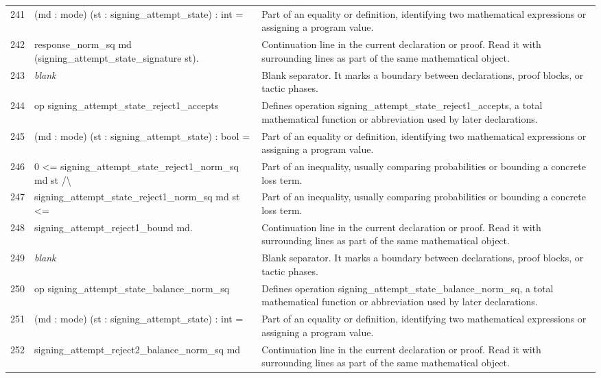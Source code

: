 \documentclass[10pt]{article}
\begin{document}
\begin{longtable}{r L{0.53\textwidth} L{0.37\textwidth}}
241 & {\ttfamily\scriptsize    (md : mode) (st : signing\_attempt\_state) : int =} & Part of an equality or definition, identifying two mathematical expressions or assigning a program value. \\
242 & {\ttfamily\scriptsize   response\_norm\_sq md (signing\_attempt\_state\_signature st).} & Continuation line in the current declaration or proof.  Read it with surrounding lines as part of the same mathematical object. \\
243 & {\ttfamily\scriptsize \emph{blank}} & Blank separator.  It marks a boundary between declarations, proof blocks, or tactic phases. \\
244 & {\ttfamily\scriptsize op signing\_attempt\_state\_reject1\_accepts} & Defines operation signing\_attempt\_state\_reject1\_accepts, a total mathematical function or abbreviation used by later declarations. \\
245 & {\ttfamily\scriptsize    (md : mode) (st : signing\_attempt\_state) : bool =} & Part of an equality or definition, identifying two mathematical expressions or assigning a program value. \\
246 & {\ttfamily\scriptsize   0 <= signing\_attempt\_state\_reject1\_norm\_sq md st /\textbackslash{}} & Part of an inequality, usually comparing probabilities or bounding a concrete loss term. \\
247 & {\ttfamily\scriptsize   signing\_attempt\_state\_reject1\_norm\_sq md st <=} & Part of an inequality, usually comparing probabilities or bounding a concrete loss term. \\
248 & {\ttfamily\scriptsize     signing\_attempt\_reject1\_bound md.} & Continuation line in the current declaration or proof.  Read it with surrounding lines as part of the same mathematical object. \\
249 & {\ttfamily\scriptsize \emph{blank}} & Blank separator.  It marks a boundary between declarations, proof blocks, or tactic phases. \\
250 & {\ttfamily\scriptsize op signing\_attempt\_state\_balance\_norm\_sq} & Defines operation signing\_attempt\_state\_balance\_norm\_sq, a total mathematical function or abbreviation used by later declarations. \\
251 & {\ttfamily\scriptsize    (md : mode) (st : signing\_attempt\_state) : int =} & Part of an equality or definition, identifying two mathematical expressions or assigning a program value. \\
252 & {\ttfamily\scriptsize   signing\_attempt\_reject2\_balance\_norm\_sq md} & Continuation line in the current declaration or proof.  Read it with surrounding lines as part of the same mathematical object. \\

\end{longtable}
\end{document}
